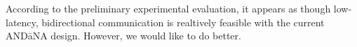 \documentclass[10pt]{article}
\begin{document}
According to the preliminary experimental evaluation, it appears as though low-latency, bidirectional communication is realtively feasible with the current {\sf AND\=aNA} design. However, we would like to do better. 




\end{document}
